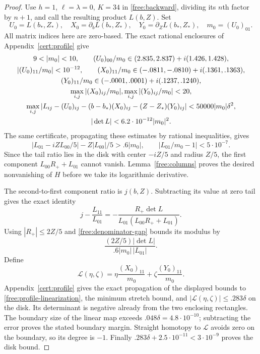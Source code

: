 \documentclass[11pt]{article}
\numberwithin{equation}{section}
\theoremstyle{definition}
\theoremstyle{remark}
\begin{document}
\begin{proof}
Use $h=1$, $\ell=\lambda=0$, $K=34$ in
\eqref{free:backward}, dividing its $n$th factor by $n+1$, and call
the resulting product $L(b,Z)$.  Set
\[
 U_0=L(b_*,Z_*),\quad X_0=\partial_bL(b_*,Z_*),\quad
 Y_0=\partial_ZL(b_*,Z_*),\quad m_0=(U_0)_{01}.
\]
All matrix indices here are zero-based.  The exact rational
enclosures of Appendix~\ref{cert:profile} give
\begin{gather}
 9<|m_0|<10,\qquad
 (U_0)_{00}/m_0\in(2.835,2.837)+i(1.426,1.428),\notag\\
 |(U_0)_{11}/m_0|<10^{-12},\qquad
 (X_0)_{11}/m_0\in(-.0811,-.0810)+i(.1361,.1363),\notag\\
 (Y_0)_{11}/m_0\in(-.0001,.0001)+i(.1237,.1240),\notag\\
 \max_{i,j}|(X_0)_{ij}/m_0|,
 \max_{i,j}|(Y_0)_{ij}/m_0|<20,\notag\\
 \max_{i,j}|L_{ij}-(U_0)_{ij}-(b-b_*)(X_0)_{ij}
                   -(Z-Z_*)(Y_0)_{ij}|<50000|m_0|\delta^2,\notag\\
 |\det L|<6.2\cdot10^{-12}|m_0|^2.\label{free:profile-enclosures}
\end{gather}
The same certificate, propagating these estimates by rational
inequalities, gives
\begin{equation}\label{free:denominator-gap}
 |L_{01}-iZL_{00}/5|-Z|L_{00}|/5>.6|m_0|,
 \qquad |L_{01}/m_0-1|<5\cdot10^{-7}.
\end{equation}
Since the tail ratio lies in the disk with center $-iZ/5$ and radius
$Z/5$, the first component $L_{00}R_++L_{01}$ cannot vanish.
Lemma~\ref{free:columns} proves the desired nonvanishing of $H$ before
we take its logarithmic derivative.

The second-to-first component ratio is $j(b,Z)$.  Subtracting its value
at zero tail gives the exact identity
\[
 j-\frac{L_{11}}{L_{01}}
 =-\frac{R_+\det L}{L_{01}(L_{00}R_++L_{01})}.
\]
Using $|R_+|\le2Z/5$ and \eqref{free:denominator-gap} bounds its
modulus by
\[
 \frac{(2Z/5)|\det L|}{.6|m_0|\,|L_{01}|}.
\]
Define
\[
 \mathcal L(\eta,\zeta)=
 \eta\frac{(X_0)_{11}}{m_0}+\zeta\frac{(Y_0)_{11}}{m_0}.
\]
Appendix~\ref{cert:profile} gives the exact propagation of the displayed
bounds to \eqref{free:profile-linearization}, the minimum stretch
bound, and $|\mathcal L(\eta,\zeta)|\le.283\delta$ on the disk.
Its determinant is negative already from the two enclosing
rectangles.  The boundary size of the linear map exceeds
$.048\delta=4.8\cdot10^{-10}$; subtracting the error proves the
stated boundary margin.  Straight homotopy to $\mathcal L$ avoids
zero on the boundary, so its degree is $-1$.  Finally
$.283\delta+2.5\cdot10^{-11}<3\cdot10^{-9}$ proves the disk bound.
\end{proof}
\end{document}
